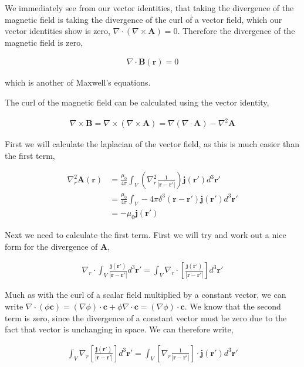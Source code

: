 \documentclass[11pt]{amsart}
\begin{document}
We immediately see from our vector identities, that taking the divergence of the magnetic field is taking the divergence of the curl of a vector field, which our vector identities show is zero, $\nabla\cdot(\nabla\times\mathbf{A})=0$. Therefore the divergence of the magnetic field is zero,

\begin{align*}
  \nabla\cdot\mathbf{B}(\mathbf{r}) = 0
\end{align*}

which is another of Maxwell's equations.

The curl of the magnetic field can be calculated using the vector identity,

\begin{align*}
  \nabla\times\mathbf{B}=\nabla\times(\nabla\times\mathbf{A})=\nabla(\nabla\cdot\mathbf{A})-\nabla^2\mathbf{A}
\end{align*}

First we will calculate the laplacian of the vector field, as this is much easier than the first term,

\begin{align*}
  \nabla_r^2\mathbf{A}(\mathbf{r})&=\frac{\mu_0}{4\pi}\int_V\left(\nabla_r^2\frac{1}{|\mathbf{r}-\mathbf{r'}|}\right)\mathbf{j}(\mathbf{r'})d^3\mathbf{r'} \\
  &= \frac{\mu_0}{4\pi}\int_V -4\pi\delta^3(\mathbf{r}-\mathbf{r'})\mathbf{j}(\mathbf{r'})d^3\mathbf{r'} \\
  &= -\mu_0\mathbf{j}(\mathbf{r'})
\end{align*}

Next we need to calculate the first term. First we will try and work out a nice form for the divergence of $\mathbf{A}$,

\begin{align*}
  \nabla_r\cdot\int_V\frac{\mathbf{j}(\mathbf{r'})}{|\mathbf{r}-\mathbf{r'}|}d^3\mathbf{r'}=\int_V\nabla_r\cdot\left[\frac{\mathbf{j}(\mathbf{r'})}{|\mathbf{r}-\mathbf{r'}|}\right]d^3\mathbf{r'}
\end{align*}

Much as with the curl of a scalar field multiplied by a constant vector, we can write $\nabla\cdot(\phi\mathbf{c})=(\nabla\phi)\cdot\mathbf{c}+\phi\nabla\cdot\mathbf{c}=(\nabla\phi)\cdot\mathbf{c}$. We know that the second term is zero, since the divergence of a constant vector must be zero due to the fact that vector is unchanging in space. We can therefore write,

\begin{align*}
  \int_V\nabla_r\left[\frac{\mathbf{j}(\mathbf{r'})}{|\mathbf{r}-\mathbf{r'}|}\right]d^3\mathbf{r'}=\int_V\left[\nabla_r\frac{1}{|\mathbf{r}-\mathbf{r'}|}\right]\cdot\mathbf{j}(\mathbf{r'})d^3\mathbf{r'}
\end{align*}
\end{document}
